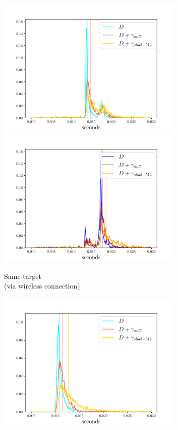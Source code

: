 \documentclass[12pt,a4paper,automark, toc=bib]{scrreprt}
\theoremstyle{definition}
\begin{document}
\begin{figure}
\begin{subfigure}{0.32\textwidth}
					\includegraphics[width=0.98\textwidth]{figures/_WLAN_complete_light.pdf}
					\includegraphics[width=0.98\textwidth]{figures/_WLAN_complete_dark.pdf}
					\caption{Same target \\(via wireless connection)}
				\end{subfigure}
				\centering
				\begin{subfigure}{0.32\textwidth}
					\includegraphics[width=0.98\textwidth]{figures/_GOOGLE_complete_light.pdf}

\end{subfigure}
\end{figure}
\end{document}
